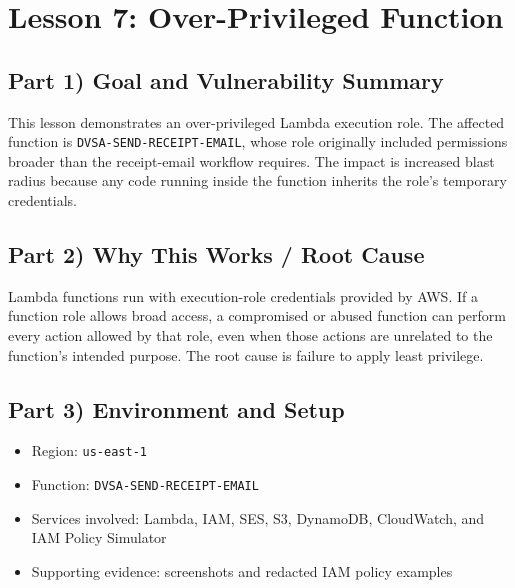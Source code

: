 \documentclass[12pt]{article}
\begin{document}
\clearpage
\section{Lesson 7: Over-Privileged Function}

\subsection*{Part 1) Goal and Vulnerability Summary}
This lesson demonstrates an over-privileged Lambda execution role. The affected function is \texttt{DVSA-SEND-RECEIPT-EMAIL}, whose role originally included permissions broader than the receipt-email workflow requires. The impact is increased blast radius because any code running inside the function inherits the role's temporary credentials.

\subsection*{Part 2) Why This Works / Root Cause}
Lambda functions run with execution-role credentials provided by AWS. If a function role allows broad access, a compromised or abused function can perform every action allowed by that role, even when those actions are unrelated to the function's intended purpose. The root cause is failure to apply least privilege.

\subsection*{Part 3) Environment and Setup}
\begin{itemize}
\item Region: \texttt{us-east-1}
\item Function: \texttt{DVSA-SEND-RECEIPT-EMAIL}
\item Services involved: Lambda, IAM, SES, S3, DynamoDB, CloudWatch, and IAM Policy Simulator
\item Supporting evidence: screenshots and redacted IAM policy examples
\end{itemize}
\end{document}
